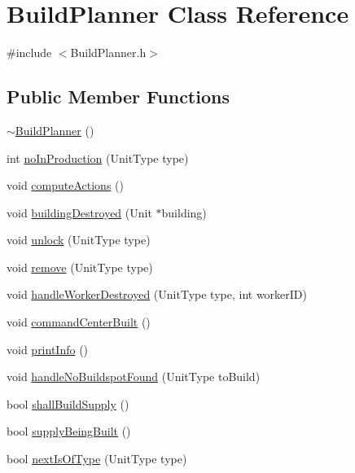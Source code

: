 \hypertarget{class_build_planner}{
\section{BuildPlanner Class Reference}
\label{class_build_planner}
}


{\ttfamily \#include $<$BuildPlanner.h$>$}

\subsection*{Public Member Functions}
\begin{DoxyCompactItemize}
\item 
\hyperlink{class_build_planner_a797598ca06af51d824fa8ceffaa2faab}{$\sim$BuildPlanner} ()
\item 
int \hyperlink{class_build_planner_adbb59b2cc6c298811460ff0cfd974b5f}{noInProduction} (UnitType type)
\item 
void \hyperlink{class_build_planner_a8fa07a03b34847b35b4a44d002d9a46b}{computeActions} ()
\item 
void \hyperlink{class_build_planner_ab456f2e1c9df7cf36b437a507fde0d14}{buildingDestroyed} (Unit $\ast$building)
\item 
void \hyperlink{class_build_planner_ab56e85871b6593105033ae8ef2aae743}{unlock} (UnitType type)
\item 
void \hyperlink{class_build_planner_a08a04aef9457456b6fa5e22e0f6e038d}{remove} (UnitType type)
\item 
void \hyperlink{class_build_planner_aea2fa91a14ae565e3c1935647d85cf8f}{handleWorkerDestroyed} (UnitType type, int workerID)
\item 
void \hyperlink{class_build_planner_a3478ec0ada31a282755eea8e32fca2a8}{commandCenterBuilt} ()
\item 
void \hyperlink{class_build_planner_a477f4f2e160c1d46480c245a4f1c2571}{printInfo} ()
\item 
void \hyperlink{class_build_planner_acc4103d9ec70c2a7a7c659230841dce7}{handleNoBuildspotFound} (UnitType toBuild)
\item 
bool \hyperlink{class_build_planner_a66309a5fe565470b925343ee0bb07332}{shallBuildSupply} ()
\item 
bool \hyperlink{class_build_planner_a99b5007262aa34e7f25ca3cffa3e3184}{supplyBeingBuilt} ()
\item 
bool \hyperlink{class_build_planner_a3a6980d66668e74932edc9d8df615d83}{nextIsOfType} (UnitType type)
\item 

\end{DoxyCompactItemize}
